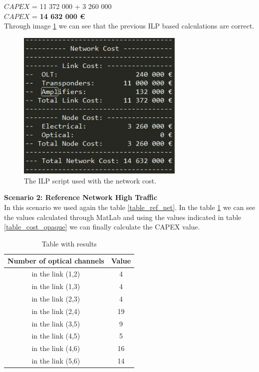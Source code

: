 $CAPEX$ = 11 372 000 + 3 260 000 \\
$CAPEX$ = \textbf{14 632 000 \euro}\\

Through image \ref{scriptopaque_surv_ref_low} we can see that the previous ILP based calculations are correct.
\begin{figure}[h!]
\centering
\includegraphics[width=8cm]{sdf/opaque/figures/script_opaque_surv_ref_low}
\caption{The ILP script used with the network cost.}
\label{scriptopaque_surv_ref_low}
\end{figure}


\textbf{Scenario 2: Reference Network High Traffic} \label{Scenario2_opaque} \\

In this scenario we used again the table \ref{table_ref_net}. In the table \ref{result_ILP2_reference} we can see the values calculated through MatLab and using the values indicated in table \ref{table_cost_opaque} we can finally calculate the CAPEX value.
\begin{table}[h!]
\centering
\begin{tabular}{|| c | c||}
 \hline
 Number of optical channels & Value \\
 \hline\hline
 in the link (1,2) & 4 \\
 in the link (1,3) & 4 \\
 in the link (2,3) & 4 \\
 in the link (2,4) & 19 \\
 in the link (3,5) & 9 \\
 in the link (4,5) & 5 \\
 in the link (4,6) & 16 \\
 in the link (5,6) & 14 \\
 \hline
\end{tabular}
\caption{Table with results}
\label{result_ILP2_reference}
\end{table}

